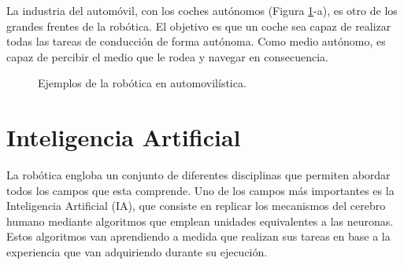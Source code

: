 La industria del automóvil, con los coches autónomos (Figura \ref{fig:coches}-a), es otro de los grandes frentes de la robótica. El objetivo es que un coche sea capaz de realizar todas las tareas de conducción de forma autónoma. Como medio autónomo, es capaz de percibir el medio que le rodea y navegar en consecuencia.
\begin{figure}[h!]
  \begin{center}
    \hspace{2mm}
  \end{center}
\caption{Ejemplos de la robótica en automovilística.} \label{fig:coches}
\end{figure}

\section{Inteligencia Artificial}
La robótica engloba un conjunto de diferentes disciplinas que permiten abordar todos los campos que esta comprende. Uno de los campos más importantes es la Inteligencia Artificial (IA), que consiste en replicar los mecanismos del cerebro humano mediante algoritmos que emplean unidades equivalentes a las neuronas. Estos algoritmos van aprendiendo a medida que realizan sus tareas en base a la experiencia que van adquiriendo durante su ejecución.\\

